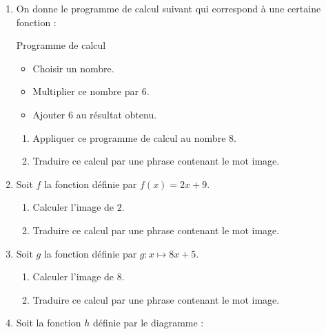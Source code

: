 \begin{exercice}
    \begin{enumerate}
        \item On donne le programme de calcul suivant qui correspond à une certaine fonction :
        \begin{myBox}{Programme de calcul}
            \begin{itemize}
                \item Choisir un nombre.
                \item Multiplier ce nombre par $6$.
                \item Ajouter $6$ au résultat obtenu.
            \end{itemize}
        \end{myBox}       
       \begin{enumerate}
            \item Appliquer ce programme de calcul au nombre $8$.
            \item Traduire ce calcul par une phrase contenant le mot image.
        \end{enumerate}    
        \item Soit $f$ la fonction définie par $f(x)= 2x+9$.
        \begin{enumerate}
            \item Calculer l'image de $2$.
            \item Traduire ce calcul par une phrase contenant le mot image.
        \end{enumerate}
        \item Soit $g$ la fonction définie par $g:x\longmapsto 8x+5$.
        \begin{enumerate}
        \item Calculer l'image de $8$.
        \item Traduire ce calcul par une phrase contenant le mot image.
    \end{enumerate}
    
        \item Soit la fonction $h$ définie par le diagramme :
        

\end{enumerate}
\end{exercice}
